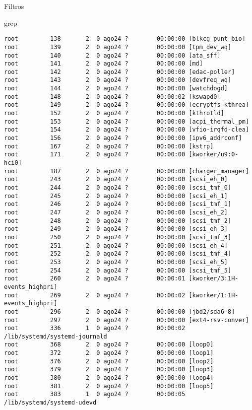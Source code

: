 \begin{section}{Filtros}
\begin{subsection}{grep}
\begin{lstlisting}[style=Ubuntu]
root         138       2  0 ago24 ?        00:00:00 [blkcg_punt_bio]
root         139       2  0 ago24 ?        00:00:00 [tpm_dev_wq]
root         140       2  0 ago24 ?        00:00:00 [ata_sff]
root         141       2  0 ago24 ?        00:00:00 [md]
root         142       2  0 ago24 ?        00:00:00 [edac-poller]
root         143       2  0 ago24 ?        00:00:00 [devfreq_wq]
root         144       2  0 ago24 ?        00:00:00 [watchdogd]
root         148       2  0 ago24 ?        00:00:02 [kswapd0]
root         149       2  0 ago24 ?        00:00:00 [ecryptfs-kthrea]
root         152       2  0 ago24 ?        00:00:00 [kthrotld]
root         153       2  0 ago24 ?        00:00:00 [acpi_thermal_pm]
root         154       2  0 ago24 ?        00:00:00 [vfio-irqfd-clea]
root         156       2  0 ago24 ?        00:00:00 [ipv6_addrconf]
root         167       2  0 ago24 ?        00:00:00 [kstrp]
root         171       2  0 ago24 ?        00:00:00 [kworker/u9:0-hci0]
root         187       2  0 ago24 ?        00:00:00 [charger_manager]
root         243       2  0 ago24 ?        00:00:00 [scsi_eh_0]
root         244       2  0 ago24 ?        00:00:00 [scsi_tmf_0]
root         245       2  0 ago24 ?        00:00:00 [scsi_eh_1]
root         246       2  0 ago24 ?        00:00:00 [scsi_tmf_1]
root         247       2  0 ago24 ?        00:00:00 [scsi_eh_2]
root         248       2  0 ago24 ?        00:00:00 [scsi_tmf_2]
root         249       2  0 ago24 ?        00:00:00 [scsi_eh_3]
root         250       2  0 ago24 ?        00:00:00 [scsi_tmf_3]
root         251       2  0 ago24 ?        00:00:00 [scsi_eh_4]
root         252       2  0 ago24 ?        00:00:00 [scsi_tmf_4]
root         253       2  0 ago24 ?        00:00:00 [scsi_eh_5]
root         254       2  0 ago24 ?        00:00:00 [scsi_tmf_5]
root         260       2  0 ago24 ?        00:00:01 [kworker/3:1H-events_highpri]
root         269       2  0 ago24 ?        00:00:02 [kworker/1:1H-events_highpri]
root         296       2  0 ago24 ?        00:00:00 [jbd2/sda6-8]
root         297       2  0 ago24 ?        00:00:00 [ext4-rsv-conver]
root         336       1  0 ago24 ?        00:00:02 /lib/systemd/systemd-journald
root         368       2  0 ago24 ?        00:00:00 [loop0]
root         372       2  0 ago24 ?        00:00:00 [loop1]
root         376       2  0 ago24 ?        00:00:00 [loop2]
root         379       2  0 ago24 ?        00:00:00 [loop3]
root         380       2  0 ago24 ?        00:00:00 [loop4]
root         381       2  0 ago24 ?        00:00:00 [loop5]
root         383       1  0 ago24 ?        00:00:05 /lib/systemd/systemd-udevd

\end{lstlisting}
\end{subsection}
\end{section}
